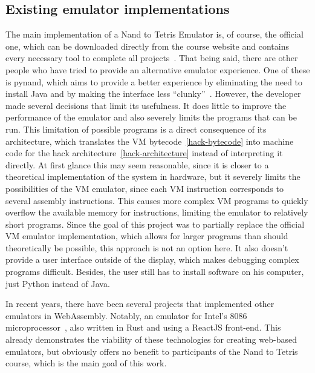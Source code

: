 \subsection{Existing emulator implementations}
The main implementation of a Nand to Tetris Emulator is, of course, the official one, which can be downloaded directly from the course website and contains every necessary tool to complete all projects~\cite[Software]{n2tweb}.
\label{pynand}
That being said, there are other people who have tried to provide an alternative emulator experience.
One of these is pynand, which aims to provide a better experience by eliminating the need to install Java and by making the interface less ``clunky''~\cite{pynand}.
However, the developer made several decisions that limit its usefulness.
It does little to improve the performance of the emulator and also severely limits the programs that can be run.
This limitation of possible programs is a direct consequence of its architecture, which translates the VM bytecode~\ref{hack-bytecode} into machine code for the hack architecture~\ref{hack-architecture} instead of interpreting it directly.
At first glance this may seem reasonable, since it is closer to a theoretical implementation of the system in hardware, but it severely limits the possibilities of the VM emulator, since each VM instruction corresponds to several assembly instructions.
This causes more complex VM programs to quickly overflow the available memory for instructions, limiting the emulator to relatively short programs.
Since the goal of this project was to partially replace the official VM emulator implementation, which allows for larger programs than should theoretically be possible, this approach is not an option here.
It also doesn't provide a user interface outside of the display, which makes debugging complex programs difficult. Besides, the user still has to install software on his computer, just Python instead of Java.


In recent years, there have been several projects that implemented other emulators in WebAssembly. Notably, an emulator for Intel's 8086 microprocessor~\cite{9824078}, also written in Rust and using a ReactJS front-end. This already demonstrates the viability of these technologies for creating web-based emulators, but obviously offers no benefit to participants of the Nand to Tetris course, which is the main goal of this work.

